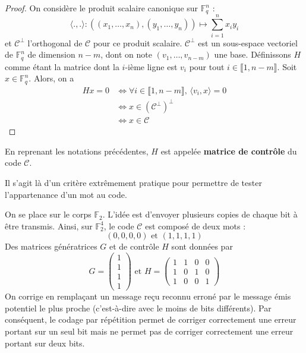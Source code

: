 	\begin{proof}
		On considère le produit scalaire canonique sur $\mathbb{F}_q^n$ :
		\[ \langle ., . \rangle : ((x_1, \dots, x_n), (y_1, \dots, y_n)) \mapsto \sum_{i=1}^n x_iy_i \]
		et $\mathcal{C}^\perp$ l'orthogonal de $\mathcal{C}$ pour ce produit scalaire. $\mathcal{C}^\perp$ est un sous-espace vectoriel de $\mathbb{F}_q^n$ de dimension $n-m$, dont on note $(v_1, \dots, v_{n-m})$ une base. Définissons $H$ comme étant la matrice dont la $i$-ième ligne est $v_i$ pour tout $i \in \llbracket 1, n-m \rrbracket$.  Soit $x \in \mathbb{F}_q^n$. Alors, on a
		\begin{align*}
			Hx = 0 &\iff \forall i \in \llbracket 1, n-m \rrbracket, \, \langle v_i, x \rangle = 0 \\
			&\iff x \in (\mathcal{C}^\perp)^\perp \\
			&\iff x \in \mathcal{C}
		\end{align*}
	\end{proof}
	
	\begin{definition}
		En reprenant les notations précédentes, $H$ est appelée \textbf{matrice de contrôle} du code $\mathcal{C}$.
	\end{definition}
	
	Il s'agit là d'un critère extrêmement pratique pour permettre de tester l'appartenance d'un mot au code.
	
	\begin{example}
		On se place sur le corps $\mathbb{F}_2$. L'idée est d'envoyer plusieurs copies de chaque bit à être transmis. Ainsi, sur $\mathbb{F}_2^4$, le code $\mathcal{C}$ est composé de deux mots :
		\[ (0,0,0,0) \text{ et } (1,1,1,1) \]
		Des matrices génératrices $G$ et de contrôle $H$ sont données par
		\[
			G = \begin{pmatrix}
				1 \\
				1 \\
				1 \\
				1
			\end{pmatrix}
			\text{ et }
			H = \begin{pmatrix}
				1 & 1 & 0 & 0 \\
				1 & 0 & 1 & 0 \\
				1 & 0 & 0 & 1
			\end{pmatrix}
		\]
		On corrige en remplaçant un message reçu reconnu erroné par le message émis potentiel le plus proche (c'est-à-dire avec le moins de bits différents). Par conséquent, le codage par répétition permet de corriger correctement une erreur portant sur un seul bit mais ne permet pas de corriger correctement une erreur portant sur deux bits.
	\end{example}
	
